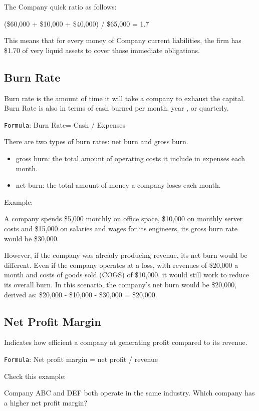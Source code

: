 \documentclass[]{book}
\providecommand{\tightlist}{%
  \setlength{\itemsep}{0pt}\setlength{\parskip}{0pt}}
\begin{document}
The Company quick ratio as follows:

(\$60,000 + \$10,000 + \$40,000) / \$65,000 = 1.7

This means that for every money of Company current liabilities, the firm
has \$1.70 of very liquid assets to cover those immediate obligations.

\subsection{Burn Rate}\label{burn-rate}

Burn rate is the amount of time it will take a company to exhaust the
capital. Burn Rate is also in terms of cash burned per month, year , or
quarterly.

\texttt{Formula}: Burn Rate= Cash / Expenses

There are two types of burn rates: net burn and gross burn.

\begin{itemize}
\tightlist
\item
  gross burn: the total amount of operating costs it include in expenses
  each month.
\item
  net burn: the total amount of money a company loses each month.
\end{itemize}

Example:

A company spends \$5,000 monthly on office space, \$10,000 on monthly
server costs and \$15,000 on salaries and wages for its engineers, its
gross burn rate would be \$30,000.

However, if the company was already producing revenue, its net burn
would be different. Even if the company operates at a loss, with
revenues of \$20,000 a month and costs of goods sold (COGS) of \$10,000,
it would still work to reduce its overall burn. In this scenario, the
company's net burn would be \$20,000, derived as: \$20,000 - \$10,000 -
\$30,000 = \$20,000.

\subsection{Net Profit Margin}\label{net-profit-margin}

Indicates how efficient a company at generating profit compared to its
revenue.

\texttt{Formula}: Net profit margin = net profit / revenue

Check this example:

Company ABC and DEF both operate in the same industry. Which company has
a higher net profit margin?
\end{document}

